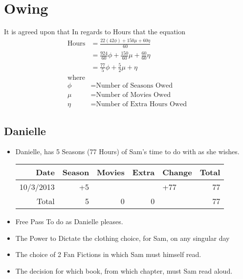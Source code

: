 

 

 \section{Owing}
 It is agreed upon that In regards to Hours that the equation
 \large
 \begin{align}
 \text{Hours} &= \frac{22(42\phi)+150\mu + 60\eta}{60}\\
 &= \frac{924}{60}\phi + \frac{150}{60}\mu + \frac{60}{60}\eta\\
 &= \frac{77}{5}\phi + \frac{5}{2}\mu + \eta\\\nonumber
  \text{where}\\ \nonumber
 \phi &=  \text{Number of Seasons Owed}\\\nonumber
 \mu &=  \text{Number of Movies Owed}\\\nonumber
 \eta &=  \text{Number of Extra Hours Owed}
 \end{align}
 
 

  
 \normalsize
 \subsection{Danielle}

 \begin{itemize}
   \item Danielle, has 5 Seasons (77 Hours) of Sam's time to do with as she wishes.\\
    \begin{tabular}{r|rrr|l|r}
 		Date&Season&Movies&Extra&Change&Total\\
 		\hline
 		10/3/2013&+5&&&+77& 77\\
 		\hline
 		\hline
 		Total&5&0&0&&77
 	\end{tabular}
   \item Free Pass To do as Danielle pleases.
   \item The Power to Dictate the clothing choice, for Sam, on any singular day
   \item The choice of 2 Fan Fictions in which Sam must himself read.
   \item The decision for which book, from which chapter, must Sam read aloud.
 \end{itemize} 
\newpage

 

